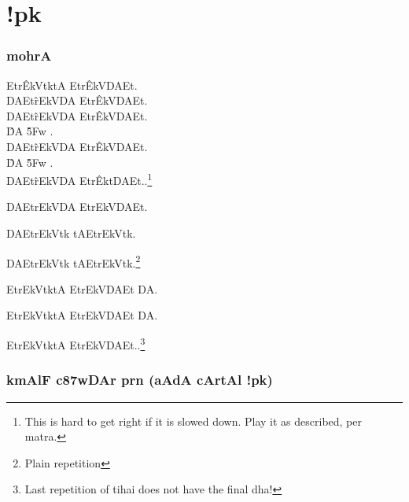 \documentclass{tufte-book}
\def\samaindent{\parindent=0.5in}
\def\dnitem#1{\noindent\llap{#1\space}\leftskip\parindent}
\begin{document}
\dnsamaveda

{\dn
\chapter{!pk}}

\subsection{ {\dn mohrA}}

{\dn \dnnum
{\dnsamaveda \samaindent
\dnitem{\rn{2}}

Etr\^{EkV}{}tktA Etr\^{EkV}{}DAEt.\\
DAEt\^{rEk}{}VDA Etr\^{EkV}{}DAEt.\\
DAEt\^{rEk}{}VDA Etr\^{EkV}{}DAEt.\\
\hspace{0.25in} \^{DA}{} \hspace{0.5in} \^{\35Fw}{} \hspace{0.25in}.\\
DAEt\^{rEk}{}VDA Etr\^{EkV}{}DAEt.\\
\hspace{0.25in} \^{DA}{} \hspace{0.5in} \^{\35Fw}{} \hspace{0.25in}.\\
DAEt\^{rEk}{}VDA Etr\^{Ekt}{}DAEt..\footnote{This is hard to get right if it is slowed down. Play it as
described, per matra.}
\\}}
{\dn \dnnum
{\dnsamaveda \samaindent
\dnitem{\rn{3}}

DAEtrEkVDA EtrEkVDAEt.

DAEtrEkVtk tAEtrEkVtk.

DAEtrEkVtk tAEtrEkVtk.\footnote{Plain repetition}

EtrEkVtktA EtrEkVDAEt DA.

EtrEkVtktA EtrEkVDAEt DA.

EtrEkVtktA EtrEkVDAEt..\footnote{Last repetition of tihai does not have the final dha!}

}}

\subsection{ {\dn kmAlF c\387wDAr prn {\rs (\re}aAdA cArtAl !pk{\rs )\re}}}
\end{document}
